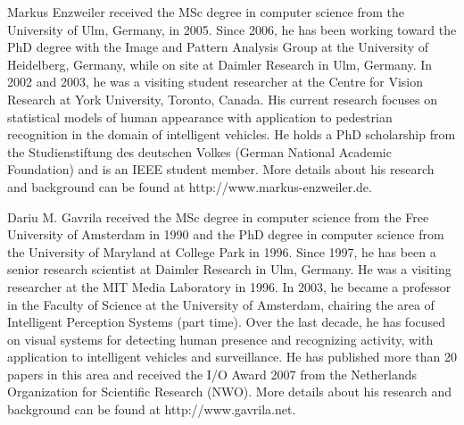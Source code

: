\documentclass[10pt,letterpaper,journal,compsoc]{IEEEtran}
\begin{document}
\begin{IEEEbiography}{Markus Enzweiler}
received the MSc degree in
computer science from the University of Ulm,
Germany, in 2005. Since 2006, he has been
working toward the PhD degree with the Image
and Pattern Analysis Group at the University of
Heidelberg, Germany, while on site at Daimler
Research in Ulm, Germany. In 2002 and 2003,
he was a visiting student researcher at the
Centre for Vision Research at York University,
Toronto, Canada. His current research focuses
on statistical models of human appearance with application to
pedestrian recognition in the domain of intelligent vehicles. He holds a
PhD scholarship from the Studienstiftung des deutschen Volkes
(German National Academic Foundation) and is an IEEE student
member. More details about his research and background can be found
at http://www.markus-enzweiler.de.
\end{IEEEbiography}
\begin{IEEEbiography}{Dariu M. Gavrila}
received the MSc degree in
computer science from the Free University of
Amsterdam in 1990 and the PhD degree in
computer science from the University of Maryland
at College Park in 1996. Since 1997, he
has been a senior research scientist at Daimler
Research in Ulm, Germany. He was a visiting
researcher at the MIT Media Laboratory in
1996. In 2003, he became a professor in the
Faculty of Science at the University of Amsterdam,
chairing the area of Intelligent Perception Systems (part time).
Over the last decade, he has focused on visual systems for detecting
human presence and recognizing activity, with application to intelligent
vehicles and surveillance. He has published more than 20 papers in
this area and received the I/O Award 2007 from the Netherlands
Organization for Scientific Research (NWO). More details about his
research and background can be found at http://www.gavrila.net.
\end{IEEEbiography}
\end{document}
